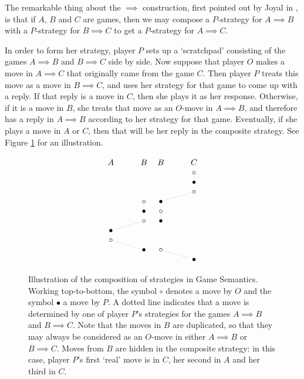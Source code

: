 \documentclass[11pt]{report}
\begin{document}
The remarkable thing about the $\implies$ construction, first pointed out by Joyal in \cite{joyalgames}, is that if $A$, $B$ and $C$ are games, then we may compose a $P$-strategy for $A\implies B$ with a $P$-strategy for $B\implies C$ to get a $P$-strategy for $A\implies C$.

In order to form her strategy, player $P$ sets up a `scratchpad' consisting of the games $A\implies B$ and $B\implies C$ side by side.
Now suppose that player $O$ makes a move in $A\implies C$ that originally came from the game $C$.  
Then player $P$ treats this move as a move in $B\implies C$, and uses her strategy for that game to come up with a reply.  
If that reply is a move in $C$, then she plays it as her response.
Otherwise, if it is a move in $B$, she treats that move as an $O$-move in $A\implies B$, and therefore has a reply in $A\implies B$ according to her strategy for that game.  
Eventually, if she plays a move in $A$ or $C$, then that will be her reply in the composite strategy.
See Figure \ref{FigComposition} for an illustration.
\begin{figure}
  \[
    \begin{tikzcd}[arrows={no head, dotted, shorten=-1mm}, row sep=0pt]
      A
        & B
          &[-20pt] B
            & C \\
        & 
          &
            & \circ \arrow[d] \\
        & 
          & 
            & \bullet \\
        & 
          & 
            & \circ \arrow[dl] \\
        & \circ \arrow[d]
          & \bullet
            & \\
        & \bullet
          & \circ \arrow[d]
            & \\
        & \circ \arrow[dl]
          & \bullet
            & \\
      \bullet
        &
          &
            & \\
      \circ \arrow[dr]
        &
          &
            & \\
        & \bullet
          & \circ \arrow[dr]
            & \\
        &
          &
            & \bullet
    \end{tikzcd}
    \]
  \caption[Illustration of the composition of strategies in Game Semantics.]{Illustration of the composition of strategies in Game Semantics.  
  Working top-to-bottom, the symbol $\circ$ denotes a move by $O$ and the symbol $\bullet$ a move by $P$.  
  A dotted line indicates that a move is determined by one of player $P$'s strategies for the games $A\implies B$ and $B\implies C$.  
  Note that the moves in $B$ are duplicated, so that they may always be considered as an $O$-move in either $A\implies B$ or $B\implies C$.  
  Moves from $B$ are hidden in the composite strategy: in this case, player $P$'s first `real' move is in $C$, her second in $A$ and her third in $C$.}
  \label{FigComposition}
\end{figure}
\end{document}
